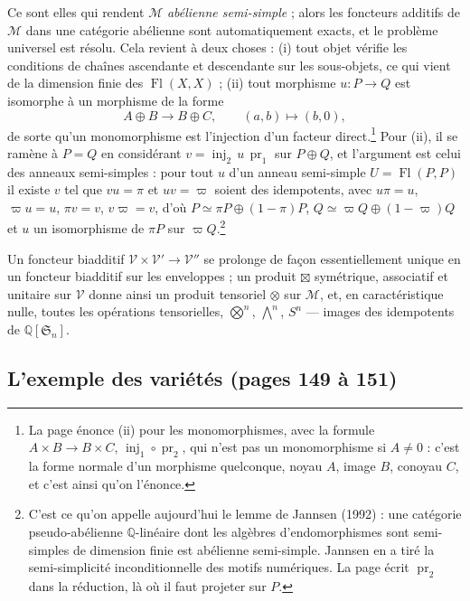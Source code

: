 \documentclass[11pt,a4paper]{article}
\begin{document}
Ce sont elles qui rendent $\mathcal{M}$ \emph{abélienne semi-simple} ; alors les
foncteurs additifs de $\mathcal{M}$ dans une catégorie abélienne sont automatiquement
exacts, et le problème universel est résolu. Cela revient à deux choses : (i) tout
objet vérifie les conditions de chaînes ascendante et descendante sur les
sous-objets, ce qui vient de la dimension finie des $\operatorname{Fl}(X,X)$ ; (ii)
tout morphisme $u \colon P \to Q$ est isomorphe à un morphisme de la forme
\[
A \oplus B \longrightarrow B \oplus C , \qquad (a, b) \longmapsto (b, 0) ,
\]
de sorte qu'un monomorphisme est l'injection d'un facteur direct.\footnote{La page
énonce (ii) pour les monomorphismes, avec la formule $A \times B \to B \times C$,
$\operatorname{inj}_{1} \circ \operatorname{pr}_{2}$, qui n'est pas un monomorphisme
si $A \neq 0$ : c'est la forme normale d'un morphisme quelconque, noyau $A$, image
$B$, conoyau $C$, et c'est ainsi qu'on l'énonce.} Pour (ii), il se ramène à $P = Q$
en considérant $v = \operatorname{inj}_{2}\,u\,\operatorname{pr}_{1}$ sur $P \oplus
Q$, et l'argument est celui des anneaux semi-simples : pour tout $u$ d'un anneau
semi-simple $U = \operatorname{Fl}(P,P)$ il existe $v$ tel que $vu = \pi$ et $uv =
\varpi$ soient des idempotents, avec $u\pi = u$, $\varpi u = u$, $\pi v = v$, $v\varpi
= v$, d'où $P \simeq \pi P \oplus (1-\pi)P$, $Q \simeq \varpi Q \oplus (1-\varpi)Q$
et $u$ un isomorphisme de $\pi P$ sur $\varpi Q$.\footnote{C'est ce qu'on appelle
aujourd'hui le lemme de Jannsen (1992) : une catégorie pseudo-abélienne
$\mathbb{Q}$-linéaire dont les algèbres d'endomorphismes sont semi-simples de
dimension finie est abélienne semi-simple. Jannsen en a tiré la semi-simplicité
inconditionnelle des motifs numériques. La page écrit $\operatorname{pr}_{2}$ dans
la réduction, là où il faut projeter sur $P$.}

Un foncteur biadditif $\mathcal{V} \times \mathcal{V}' \to \mathcal{V}''$ se prolonge
de façon essentiellement unique en un foncteur biadditif sur les enveloppes ; un
produit $\boxtimes$ symétrique, associatif et unitaire sur $\mathcal{V}$ donne ainsi
un produit tensoriel $\otimes$ sur $\mathcal{M}$, et, en caractéristique nulle,
toutes les opérations tensorielles, $\bigotimes^{n}$, $\bigwedge^{n}$,
$S^{n}$ --- images des idempotents de $\mathbb{Q}[\mathfrak{S}_{n}]$.

\subsection*{L'exemple des variétés (pages 149 à 151)}
\end{document}
